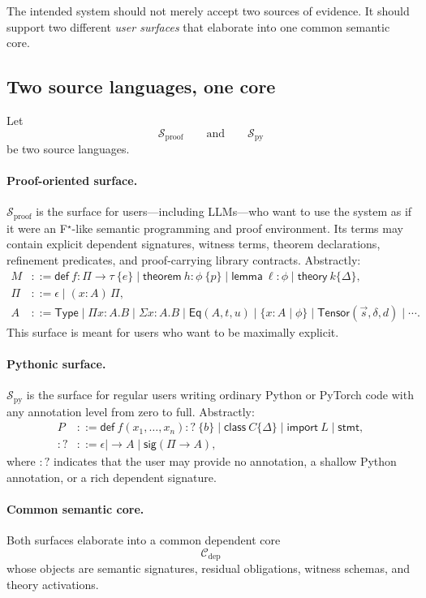\documentclass[11pt]{article}
\newcommand{\Type}{\ensuremath{\mathsf{Type}}}
\theoremstyle{definition}
\theoremstyle{plain}
\begin{document}
The intended system should not merely accept two sources of evidence. It should
support two different \emph{user surfaces} that elaborate into one common
semantic core.

\subsection{Two source languages, one core}
Let
\[
\mathcal{S}_{\mathrm{proof}}
\qquad\text{and}\qquad
\mathcal{S}_{\mathrm{py}}
\]
be two source languages.

\paragraph{Proof-oriented surface.}
$\mathcal{S}_{\mathrm{proof}}$ is the surface for users---including LLMs---who
want to use the system as if it were an F$^\star$-like semantic programming and
proof environment. Its terms may contain explicit dependent signatures, witness
terms, theorem declarations, refinement predicates, and proof-carrying library
contracts. Abstractly:
\begin{align*}
M &::= \mathsf{def}\ f : \Pi \to \tau\ \{e\}
\mid \mathsf{theorem}\ h : \phi\ \{p\}
\mid \mathsf{lemma}\ \ell : \phi
\mid \mathsf{theory}\ k\{\Delta\}, \\
\Pi &::= \epsilon \mid (x : A)\,\Pi, \\
A &::= \Type \mid \Pi x : A . B \mid \Sigma x : A . B \mid \mathsf{Eq}(A,t,u)
\mid \{x : A \mid \phi\} \mid \mathsf{Tensor}(\vec{s},\delta,d) \mid \cdots.
\end{align*}
This surface is meant for users who want to be maximally explicit.

\paragraph{Pythonic surface.}
$\mathcal{S}_{\mathrm{py}}$ is the surface for regular users writing ordinary
Python or PyTorch code with any annotation level from zero to full. Abstractly:
\begin{align*}
P &::= \mathsf{def}\ f(x_1,\ldots,x_n) :?\ \{b\}
\mid \mathsf{class}\ C\{\Delta\}
\mid \mathsf{import}\ L
\mid \mathsf{stmt}, \\
:? &::= \epsilon \mid \to A \mid \mathsf{sig}(\Pi \to A),
\end{align*}
where $:?$ indicates that the user may provide no annotation, a shallow Python
annotation, or a rich dependent signature.

\paragraph{Common semantic core.}
Both surfaces elaborate into a common dependent core
\[
\mathcal{C}_{\mathrm{dep}}
\]
whose objects are semantic signatures, residual obligations, witness schemas,
and theory activations.
\end{document}
